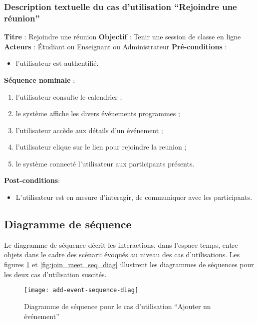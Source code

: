 \subsubsection{Description textuelle du cas d’utilisation “Rejoindre une réunion”}
\textbf{Titre} : Rejoindre une réunion\newline
\textbf{Objectif} : Tenir une session de classe en ligne\newline
\textbf{Acteurs} : Étudiant ou Enseignant ou Administrateur\newline
\textbf{Pré-conditions} : 
\begin{itemize}[noitemsep,topsep=0pt]
  \item l’utilisateur est authentifié.
\end{itemize}
\textbf{Séquence nominale} :
\begin{enumerate}[noitemsep,topsep=0pt]
  \item  l’utilisateur consulte le calendrier ;
	\item le système affiche les divers événements programmes ;
	\item l’utilisateur accède aux détails d’un événement ;
	\item l’utilisateur clique sur le lien pour rejoindre la reunion ;
	\item le système connecté l’utilisateur aux participants présents.
\end{enumerate}
\textbf{Post-conditions}: 
\begin{itemize}[noitemsep,topsep=0pt]
  \item L’utilisateur est en mesure d’interagir, de communiquer avec les participants.
\end{itemize}

\subsection{Diagramme de séquence}
Le diagramme de séquence décrit les interactions, dans l’espace temps, entre objets dans le cadre des scénarii évoqués au niveau des cas d’utilisations. 
Les figures \ref{fig:add_event_seq_diag} et \ref{fig:join_meet_seq_diag} illustrent les diagrammes de séquences pour les deux cas d’utilisation suscités.


\begin{figure}[H]
  \centering
  \texttt{[image: add-event-sequence-diag]}
  \caption{Diagramme de séquence pour le cas d’utilisation “Ajouter un événement”}
  \label{fig:add_event_seq_diag}
\end{figure}

